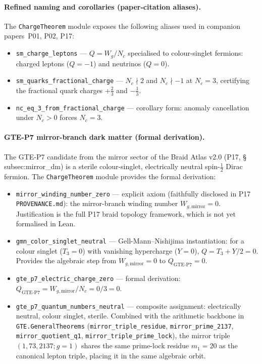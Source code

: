 \documentclass[11pt,a4paper]{article}
\theoremstyle{definition}
\begin{document}
\paragraph{Refined naming and corollaries (paper-citation aliases).}
The \texttt{ChargeTheorem} module exposes the following aliases used in
companion papers~P01, P02, P17:

\begin{itemize}[leftmargin=1.2em,itemsep=2pt]
  \item \lstinline|sm_charge_leptons| --- $Q = W_g/N_c$ specialised to colour-singlet
    fermions: charged leptons ($Q=-1$) and neutrinos ($Q=0$).
  \item \lstinline|sm_quarks_fractional_charge| --- $N_c \nmid 2$ and $N_c \nmid -1$
    at $N_c=3$, certifying the fractional quark charges $+\tfrac23$ and $-\tfrac13$.
  \item \lstinline|nc_eq_3_from_fractional_charge| --- corollary form: anomaly
    cancellation under $N_c > 0$ forces $N_c = 3$.
\end{itemize}

\paragraph{GTE-P7 mirror-branch dark matter (formal derivation).}
The GTE-P7 candidate from the mirror sector of the Braid Atlas v2.0 (P17,
\S\,subsec:mirror\_dm) is a sterile colour-singlet, electrically neutral
spin-$\tfrac12$ Dirac fermion.  The \texttt{ChargeTheorem} module provides
the formal derivation:

\begin{itemize}[leftmargin=1.2em,itemsep=2pt]
  \item \lstinline|mirror_winding_number_zero| --- explicit axiom (faithfully
    disclosed in P17 \texttt{PROVENANCE.md}): the mirror-branch winding
    number $W_{g,\text{mirror}} = 0$.  Justification is the full P17 braid
    topology framework, which is not yet formalised in Lean.
  \item \lstinline|gmn_color_singlet_neutral| --- Gell-Mann–Nishijima
    instantiation: for a colour singlet ($T_3 = 0$) with vanishing hypercharge
    ($Y = 0$), $Q = T_3 + Y/2 = 0$.  Provides the algebraic step from
    $W_{g,\text{mirror}} = 0$ to $Q_{\text{GTE-P7}} = 0$.
  \item \lstinline|gte_p7_electric_charge_zero| --- formal derivation:
    $Q_{\text{GTE-P7}} = W_{g,\text{mirror}}/N_c = 0/3 = 0$.
  \item \lstinline|gte_p7_quantum_numbers_neutral| --- composite assignment:
    electrically neutral, colour singlet, sterile.  Combined with the
    arithmetic backbone in \texttt{GTE.GeneralTheorems} (\lstinline|mirror_triple_residue|,
    \lstinline|mirror_prime_2137|, \lstinline|mirror_quotient_q1|,
    \lstinline|mirror_triple_prime_lock|), the mirror triple $(1, 73, 2137; g{=}1)$
    shares the same prime-lock residue $m_1 = 20$ as the canonical lepton
    triple, placing it in the same algebraic orbit.
\end{itemize}
\end{document}
